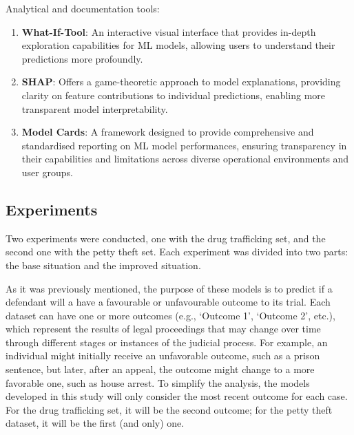 \documentclass[twoside,11pt]{article}
\begin{document}
Analytical and documentation tools:

\begin{enumerate}
    \item \textbf{What-If-Tool}: An interactive visual interface that provides in-depth exploration capabilities for ML models, allowing users to understand their predictions more profoundly.
    
    \item \textbf{SHAP}: Offers a game-theoretic approach to model explanations, providing clarity on feature contributions to individual predictions, enabling more transparent model interpretability.
    
    \item \textbf{Model Cards}: A framework designed to provide comprehensive and standardised reporting on ML model performances, ensuring transparency in their capabilities and limitations across diverse operational environments and user groups.
\end{enumerate}

\subsection{Experiments}

Two experiments were conducted, one with the drug trafficking set, and the second one with the petty theft set. Each experiment was divided into two parts: the base situation and the improved situation.

As it was previously mentioned, the purpose of these models is to predict if a defendant will a have a favourable or unfavourable outcome to its trial. Each dataset can have one or more outcomes (e.g., ‘Outcome 1’, ‘Outcome 2’, etc.), which represent the results of legal proceedings that may change over time through different stages or instances of the judicial process. For example, an individual might initially receive an unfavorable outcome, such as a prison sentence, but later, after an appeal, the outcome might change to a more favorable one, such as house arrest. To simplify the analysis, the models developed in this study will only consider the most recent outcome for each case. For the drug trafficking set, it will be the second outcome; for the petty theft dataset, it will be the first (and only) one.
\end{document}
